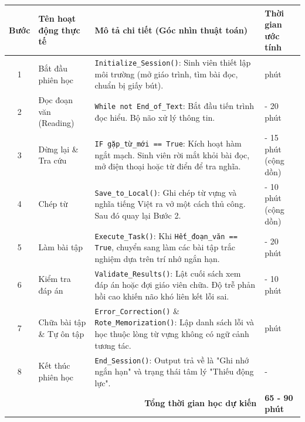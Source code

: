 \begin{table}[H]
\centering
\small
\renewcommand{\arraystretch}{1.6}
\begin{tabularx}{\textwidth}{|c|>{\raggedright\arraybackslash}p{3cm}|X|>{\centering\arraybackslash}p{2.5cm}|}
\hline
\textbf{Bước} & \textbf{Tên hoạt động thực tế} & \textbf{Mô tả chi tiết (Góc nhìn thuật toán)} & \textbf{Thời gian ước tính} \\ \hline
1 & Bắt đầu phiên học & \texttt{Initialize\_Session()}: Sinh viên thiết lập môi trường (mở giáo trình, tìm bài đọc, chuẩn bị giấy bút). & 5 phút \\ \hline
2 & Đọc đoạn văn (Reading) & \texttt{While not End\_of\_Text}: Bắt đầu tiến trình đọc hiểu. Bộ não xử lý thông tin. & 15 - 20 phút \\ \hline
3 & Dừng lại \& Tra cứu & \texttt{IF gặp\_từ\_mới == True}: Kích hoạt hàm ngắt mạch. Sinh viên rời mắt khỏi bài đọc, mở điện thoại hoặc từ điển để tra nghĩa. & 10 - 15 phút (cộng dồn) \\ \hline
4 & Chép từ & \texttt{Save\_to\_Local()}: Ghi chép từ vựng và nghĩa tiếng Việt ra vở một cách thủ công. Sau đó quay lại Bước 2. & 5 - 10 phút (cộng dồn) \\ \hline
5 & Làm bài tập & \texttt{Execute\_Task()}: Khi \texttt{Hết\_đoạn\_văn == True}, chuyển sang làm các bài tập trắc nghiệm dựa trên trí nhớ ngắn hạn. & 15 - 20 phút \\ \hline
6 & Kiểm tra đáp án & \texttt{Validate\_Results()}: Lật cuối sách xem đáp án hoặc đợi giáo viên chữa. Độ trễ phản hồi cao khiến não khó liên kết lỗi sai. & 5 - 10 phút \\ \hline
7 & Chữa bài tập \& Tự ôn tập & \texttt{Error\_Correction()} \& \texttt{Rote\_Memorization()}: Lập danh sách lỗi và học thuộc lòng từ vựng không có ngữ cảnh tương tác. & 10 phút \\ \hline
8 & Kết thúc phiên học & \texttt{End\_Session()}: Output trả về là "Ghi nhớ ngắn hạn" và trạng thái tâm lý "Thiếu động lực". & - \\ \hline
\multicolumn{3}{|r|}{\textbf{Tổng thời gian học dự kiến}} & \textbf{65 - 90 phút} \\ \hline
\end{tabularx}
\end{table}

